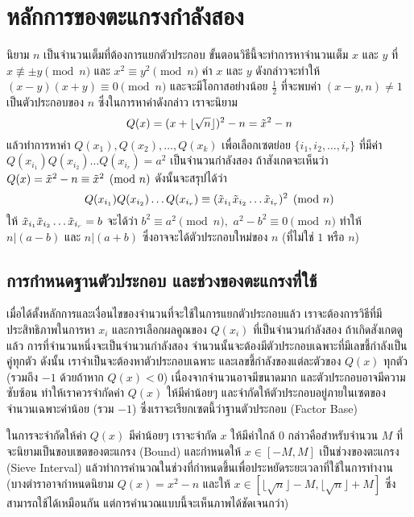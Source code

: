 \documentclass[20pt,a4paper]{article}
\begin{document}
\section{หลักการของตะแกรงกำลังสอง}
นิยาม $n$ เป็นจำนวนเต็มที่ต้องการแยกตัวประกอบ ขั้นตอนวิธีนี้จะทำการหาจำนวนเต็ม $x$ และ $y$ ที่ $x\not\equiv \pm y\pmod n$ และ $x^2\equiv y^2\pmod n$ ค่า $x$ และ $y$ ดังกล่าวจะทำให้ $(x-y)(x+y)\equiv0\pmod n$ และจะมีโอกาสอย่างน้อย $\frac{1}{2}$ ที่จะพบค่า $(x-y,n)\neq 1$ เป็นตัวประกอบของ $n$ ซึ่งในการหาค่าดังกล่าว เราจะนิยาม
\begin{equation}
    Q(x) = (x+\lfloor\sqrt{n}\rfloor)^2 - n = \Tilde{x}^2 - n 
\end{equation}
แล้วทำการหาค่า $Q(x_1),Q(x_2),\ldots,Q(x_k)$ เพื่อเลือกเซตย่อย $\{i_1,i_2,\ldots,i_r\}$ ที่มีค่า $Q(x_{i_1})Q(x_{i_2})\ldots Q(x_{i_r}) = a^2$ เป็นจำนวนกำลังสอง ถ้าสังเกตจะเห็นว่า $Q(x) = \Tilde{x}^2 - n \equiv \Tilde{x}^2 \pmod{n}$ ดังนั้นจะสรุปได้ว่า
\begin{equation}
    Q(x_{i_1})Q(x_{i_2}) \ldots Q(x_{i_r}) \equiv (\Tilde{x}_{i_1}\Tilde{x}_{i_2}\ldots\Tilde{x}_{i_r})^2 \pmod{n}
\end{equation}
ให้ $\Tilde{x}_{i_1}\Tilde{x}_{i_2}\ldots\Tilde{x}_{i_r} = b $ จะได้ว่า $b^2 \equiv a^2 \pmod{n},$ $a^2 - b^2 \equiv 0 \pmod{n}$ ทำให้ $n|(a-b)$ และ $n|(a+b)$ ซึ่งอาจจะได้ตัวประกอบใหม่ของ $n$ (ที่ไม่ใช่ $1$ หรือ $n$) \cite{landquist_2001}
\subsection{การกำหนดฐานตัวประกอบ และช่วงของตะแกรงที่ใช้}

เมื่อได้ตั้งหลักการและเงื่อนไขของจำนวนที่จะใช้ในการแยกตัวประกอบแล้ว เราจะต้องการวิธีที่มีประสิทธิภาพในการหา $x_i$ และการเลือกผลคูณของ $Q(x_i)$ ที่เป็นจำนวนกำลังสอง ถ้าเกิดสังเกตดูแล้ว การที่จำนวนหนึ่งจะเป็นจำนวนกำลังสอง จำนวนนั้นจะต้องมีตัวประกอบเฉพาะที่มีเลขชี้กำลังเป็นคู่ทุกตัว ดังนั้น เราจำเป็นจะต้องหาตัวประกอบเฉพาะ และเลขชี้กำลังของแต่ละตัวของ $Q(x)$ ทุกตัว (รวมถึง $-1$ ด้วยถ้าหาก $Q(x) < 0$) เนื่องจากจำนวนอาจมีขนาดมาก และตัวประกอบอาจมีความซับซ้อน ทำให้เราควรจำกัดค่า $Q(x)$ ให้มีค่าน้อยๆ และจำกัดให้ตัวประกอบอยู่ภายในเซตของจำนวนเฉพาะค่าน้อย (รวม $-1$) ซึ่งเราจะเรียกเซตนี้ว่าฐานตัวประกอบ (Factor Base)

\vspace{4mm}

ในการจะจำกัดให้ค่า $Q(x)$ มีค่าน้อยๆ เราจะจำกัด $x$ ให้มีค่าใกล้ $0$ กล่าวคือสำหรับจำนวน $M$ ที่จะนิยามเป็นขอบเขตของตะแกรง (Bound) และกำหนดให้ $x \in [-M,M]$ เป็นช่วงของตะแกรง (Sieve Interval) แล้วทำการคำนวณในช่วงที่กำหนดขึ้นเพื่อประหยัดระยะเวลาที่ใช้ในการทำงาน (บางตำราอาจกำหนดนิยาม $Q(x) = x^2-n$ และให้ $x \in [\lfloor\sqrt{n}\rfloor-M,\lfloor\sqrt{n}\rfloor+M]$ ซึ่งสามารถใช้ได้เหมือนกัน แต่การคำนวณแบบนี้จะเห็นภาพได้ชัดเจนกว่า)
\end{document}
